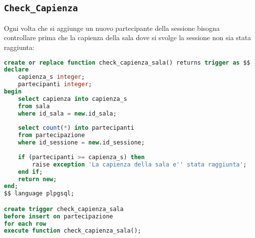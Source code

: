 \subsection{\texttt{Check\_Capienza}}
Ogni volta che si aggiunge un nuovo partecipante della sessione bisogna controllare prima che la capienza della sala dove si svolge la sessione non sia stata raggiunta:
\begin{lstlisting}[language=SQL, style=mystyle]
create or replace function check_capienza_sala() returns trigger as $$
declare
    capienza_s integer;
    partecipanti integer;
begin
    select capienza into capienza_s
    from sala
    where id_sala = new.id_sala;
    
    select count(*) into partecipanti
    from partecipazione
    where id_sessione = new.id_sessione;
    
    if (partecipanti >= capienza_s) then
        raise exception 'La capienza della sala e'' stata raggiunta';
    end if;
    return new;
end;
$$ language plpgsql;

create trigger check_capienza_sala
before insert on partecipazione
for each row
execute function check_capienza_sala();
\end{lstlisting}